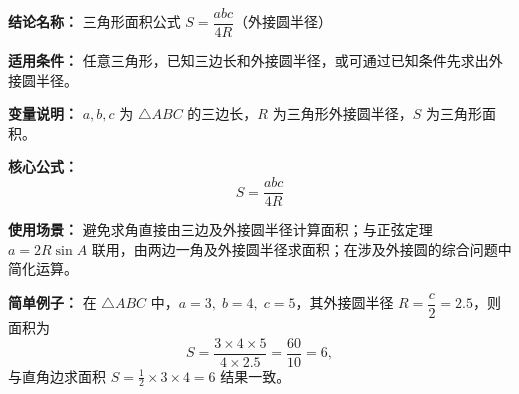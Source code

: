 \textbf{结论名称：} 三角形面积公式 \(S=\dfrac{abc}{4R}\)（外接圆半径）

\textbf{适用条件：} 任意三角形，已知三边长和外接圆半径，或可通过已知条件先求出外接圆半径。

\textbf{变量说明：} \(a,b,c\) 为 \(\triangle ABC\) 的三边长，\(R\) 为三角形外接圆半径，\(S\) 为三角形面积。

\textbf{核心公式：} \[ \boxed{S = \frac{abc}{4R}} \]

\textbf{使用场景：} 避免求角直接由三边及外接圆半径计算面积；与正弦定理 \(a=2R\sin A\) 联用，由两边一角及外接圆半径求面积；在涉及外接圆的综合问题中简化运算。

\textbf{简单例子：} 在 \(\triangle ABC\) 中，\(a=3,\;b=4,\;c=5\)，其外接圆半径 \(R=\dfrac{c}{2}=2.5\)，则面积为
\[ S = \frac{3\times4\times5}{4\times2.5} = \frac{60}{10} = 6, \]
与直角边求面积 \(S=\frac12\times3\times4=6\) 结果一致。